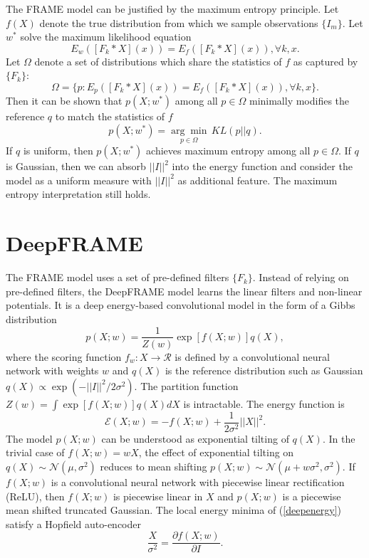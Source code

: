 \documentclass[11pt]{article}
\def\En{\mathcal{E}}
\def\I{X}
\begin{document}
The FRAME model can be justified by the maximum entropy principle. Let $f(\I)$ denote the true distribution from which we sample observations $\{I_m\}$. Let $w^*$ solve the maximum likelihood equation
\begin{equation}
E_w([F_k*\I](x)) = E_f([F_k*\I](x)), \forall k,x.\label{likeeq}
\end{equation}
Let $\Omega$ denote a set of distributions which share the statistics of $f$ as captured by $\{F_k\}$:
\begin{equation}
\Omega = \{p:E_p([F_k*\I](x)) = E_f([F_k*\I](x)), \forall k,x \}.
\end{equation}
Then it can be shown that $p(\I;w^*)$ among all $p\in\Omega$ minimally modifies the reference $q$ to match the statistics of $f$
\begin{equation}
p(\I;w^*) = \underset{p\in\Omega}{\arg\min}\,KL(p||q).
\end{equation}
If $q$ is uniform, then $p(\I;w^*)$ achieves maximum entropy among all $p\in\Omega$. If $q$ is Gaussian, then we can absorb $||I||^2$ into the energy function and consider the model as a uniform measure with $||I||^2$ as additional feature. The maximum entropy interpretation still holds.

\section{DeepFRAME}
The FRAME model uses a set of pre-defined filters $\{F_k\}$. Instead of relying on pre-defined filters, the DeepFRAME \citep{xie} model learns the linear filters and non-linear potentials.
It is a deep energy-based convolutional model in the form of a Gibbs distribution
\begin{equation}
p(\I;w)=\frac{1}{Z(w)}\exp\left[ f(\I;w) \right]q(\I),\label{deepframe}
\end{equation}
where the scoring function $f_w : \I \rightarrow \mathcal{R}$ is defined by a convolutional neural network with weights $w$ and $q(\I)$ is the reference distribution such as Gaussian $q(\I) \propto \exp(-||I||^2/2\sigma^2)$. The partition function $Z(w) = \int \exp\left[ f(\I;w) \right]q(\I) d\I$ is intractable. The energy function is
\begin{equation}
\En(\I;w)=-f(\I;w) + \frac{1}{2\sigma^2}||\I ||^2.\label{deepenergy}
\end{equation}
The model $p(\I;w)$ can be understood as exponential tilting of $q(\I)$. In the trivial case of $f(\I;w)=w\I$, the effect of exponential tilting on $q(\I) \sim \mathcal{N}(\mu,\sigma^2)$ reduces to mean shifting $p(\I;w) \sim \mathcal{N}(\mu+w\sigma^2,\sigma^2)$. If $f(\I;w)$ is a convolutional neural network with piecewise linear rectification (ReLU), then $f(\I;w)$ is piecewise linear in $\I$ and $p(\I;w)$ is a piecewise mean shifted truncated Gaussian. The local energy minima of (\ref{deepenergy}) satisfy a Hopfield auto-encoder
\begin{equation}
\frac{\I}{\sigma^2} = \frac{\partial f(\I;w)}{\partial I}.
\end{equation}
\end{document}
